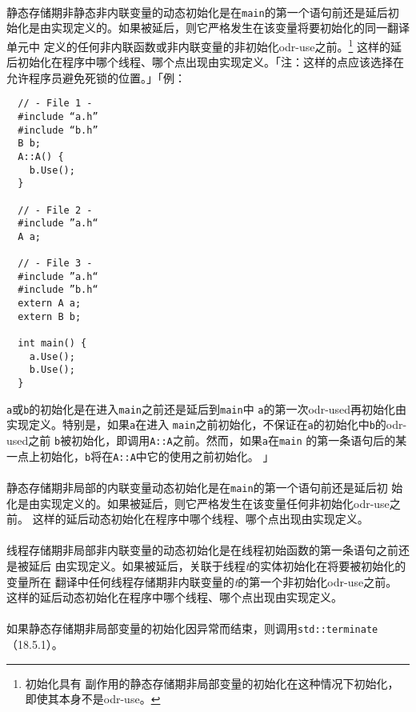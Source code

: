 \paragraph{}
静态存储期非静态非内联变量的动态初始化是在\texttt{main}的第一个语句前还是延后初
始化是由实现定义的。如果被延后，则它严格发生在该变量将要初始化的同一翻译单元中
定义的任何非内联函数或非内联变量的非初始化odr-use之前。\footnote{初始化具有
副作用的静态存储期非局部变量的初始化在这种情况下初始化，即使其本身不是odr-use。}
这样的延后初始化在程序中哪个线程、哪个点出现由实现定义。「注：这样的点应该选择在
允许程序员避免死锁的位置。」「例：
\begin{lstlisting}
  // - File 1 -
  #include “a.h”
  #include “b.h”
  B b;
  A::A() {
    b.Use();
  }

  // - File 2 -
  #include ”a.h“
  A a;

  // - File 3 -
  #include ”a.h“
  #include ”b.h“
  extern A a;
  extern B b;

  int main() {
    a.Use();
    b.Use();
  }
\end{lstlisting}
\texttt{a}或\texttt{b}的初始化是在进入\texttt{main}之前还是延后到\texttt{main}中
\texttt{a}的第一次odr-used再初始化由实现定义。特别是，如果\texttt{a}在进入
\texttt{main}之前初始化，不保证在\texttt{a}的初始化中\texttt{b}的odr-used之前
\texttt{b}被初始化，即调用\texttt{A::A}之前。然而，如果\texttt{a}在\texttt{main}
的第一条语句后的某一点上初始化，\texttt{b}将在\texttt{A::A}中它的使用之前初始化。
」

\paragraph{}
静态存储期非局部的内联变量动态初始化是在\texttt{main}的第一个语句前还是延后初
始化是由实现定义的。如果被延后，则它严格发生在该变量任何非初始化odr-use之前。
这样的延后动态初始化在程序中哪个线程、哪个点出现由实现定义。

\paragraph{}
线程存储期非局部非内联变量的动态初始化是在线程初始函数的第一条语句之前还是被延后
由实现定义。如果被延后，关联于线程\textit{t}的实体初始化在将要被初始化的变量所在
翻译中任何线程存储期非内联变量的\textit{t}的第一个非初始化odr-use之前。
这样的延后动态初始化在程序中哪个线程、哪个点出现由实现定义。

\paragraph{}
如果静态存储期非局部变量的初始化因异常而结束，则调用\texttt{std::terminate}
（18.5.1）。

